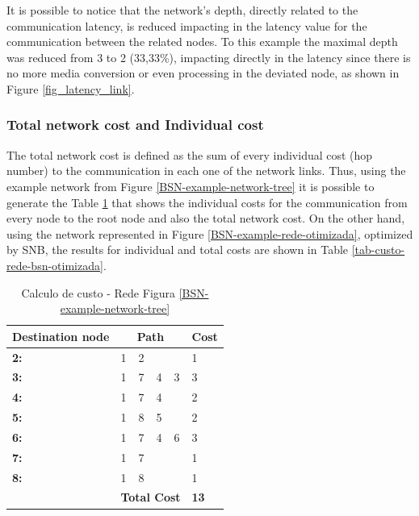 \documentclass[conference]{IEEEtran}
\begin{document}
It is possible to notice that the network’s depth, directly related to the communication latency, is reduced impacting in the latency value for the communication between the related nodes. To this example the maximal depth was reduced from 3 to 2 (33,33\%), impacting directly in the latency since there is no more media conversion or even processing in the deviated node, as shown in Figure \ref{fig_latency_link}.

\subsubsection{Total network cost and Individual cost}
The total network cost is defined as the sum of every individual cost (hop number) to the communication in each one of the network links. Thus, using the example network from Figure \ref{BSN-example-network-tree} it is possible to generate the Table \ref{tab-custo-rede-BSN-example-network-tree} that shows the individual costs for the communication from every node to the root node and also the total network cost. On the other hand, using the network represented in Figure \ref{BSN-example-rede-otimizada}, optimized by SNB, the results for individual and total costs are shown in Table \ref{tab-custo-rede-bsn-otimizada}.

\begin{table}[t!]
	\centering
			\begin{tabular}{llllll}
			\hline
			\multicolumn{1}{|l|}{\textbf{Destination node}} & \multicolumn{4}{c}{\textbf{Path}} & \multicolumn{1}{c|}{\textbf{Cost}} \\ \hline
			\multicolumn{1}{|l|}{\textbf{2:}} & 1 & 2 &  & \multicolumn{1}{l|}{} & \multicolumn{1}{l|}{1} \\ \hline
			\multicolumn{1}{|l|}{\textbf{3:}} & 1 & 7 & 4 & \multicolumn{1}{l|}{3} & \multicolumn{1}{l|}{3} \\ \hline
			\multicolumn{1}{|l|}{\textbf{4:}} & 1 & 7 & 4 & \multicolumn{1}{l|}{} & \multicolumn{1}{l|}{2} \\ \hline
			\multicolumn{1}{|l|}{\textbf{5:}} & 1 & 8 & 5 & \multicolumn{1}{l|}{} & \multicolumn{1}{l|}{2} \\ \hline
			\multicolumn{1}{|l|}{\textbf{6:}} & 1 & 7 & 4 & \multicolumn{1}{l|}{6} & \multicolumn{1}{l|}{3} \\ \hline
			\multicolumn{1}{|l|}{\textbf{7:}} & 1 & 7 &  & \multicolumn{1}{l|}{} & \multicolumn{1}{l|}{1} \\ \hline
			\multicolumn{1}{|l|}{\textbf{8:}} & 1 & 8 &  & \multicolumn{1}{l|}{} & \multicolumn{1}{l|}{1} \\ \hline
			 & \multicolumn{4}{l}{\textbf{Total Cost}} & \textbf{13}
			\end{tabular}
		\caption{Calculo de custo - Rede Figura \ref{BSN-example-network-tree}}
		\label{tab-custo-rede-BSN-example-network-tree}
\end{table}
		
\end{document}
